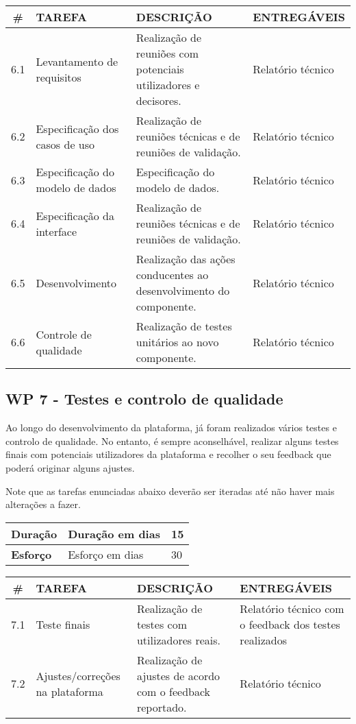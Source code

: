 \begin{longtable}{|c|p{5cm}|p{7cm}|p{3cm}|}
    \hline
    \# & \textbf{TAREFA} & \textbf{DESCRIÇÃO} & \textbf{ENTREGÁVEIS} \\
    \hline
    6.1 & Levantamento de requisitos & Realização de reuniões com potenciais utilizadores e decisores. & Relatório técnico \\
    \hline
    6.2 & Especificação dos casos de uso & Realização de reuniões técnicas e de reuniões de validação. & Relatório técnico \\
    \hline
    6.3 & Especificação do modelo de dados & Especificação do modelo de dados.
    & Relatório técnico \\
    \hline
    6.4 & Especificação da interface & Realização de reuniões técnicas e de reuniões de validação.
    & Relatório técnico \\
    \hline
    6.5 & Desenvolvimento & Realização das ações conducentes ao desenvolvimento do componente.
    & Relatório técnico \\
    \hline
    6.6 & Controle de qualidade & Realização de testes unitários ao novo componente.
    & Relatório técnico \\
    \hline
\end{longtable}


\subsection{WP 7 - Testes e controlo de qualidade}

Ao longo do desenvolvimento da plataforma, já foram realizados vários testes e controlo de qualidade.
No entanto, é sempre aconselhável, realizar alguns testes finais com potenciais utilizadores da plataforma e recolher o seu 
feedback que poderá originar alguns ajustes.

Note que as tarefas enunciadas abaixo deverão ser iteradas até não haver mais alterações a fazer.

\begin{tabular}{|p{3cm}|p{5cm}|l|}
    \hline
    \textbf{Duração} & Duração em dias & 15 \\
    \hline
    \textbf{Esforço} & Esforço em dias & 30\\
    \hline
\end{tabular}

\vspace{0.5cm}

\begin{longtable}{|c|p{5cm}|p{7cm}|p{3cm}|}
    \hline
    \# & \textbf{TAREFA} & \textbf{DESCRIÇÃO} & \textbf{ENTREGÁVEIS} \\
    \hline
    7.1 & Teste finais & Realização de testes com utilizadores reais. & Relatório técnico com o feedback dos testes realizados\\
    \hline
    7.2 & Ajustes/correções na plataforma & Realização de ajustes de acordo com o feedback reportado. & Relatório técnico \\
    \hline
\end{longtable}


